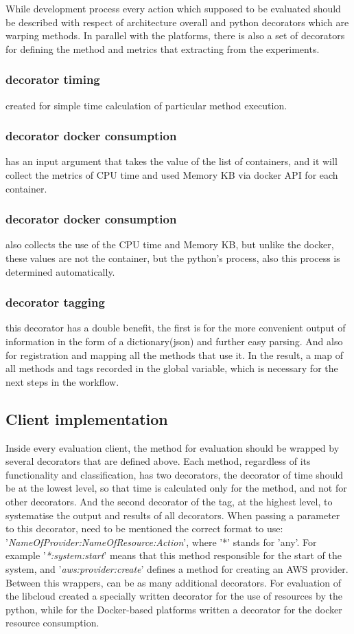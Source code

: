 While development process every action which supposed to be evaluated should be described with respect of architecture overall and python decorators which are warping methods. In parallel with the platforms, there is also a set of decorators for defining the method and metrics that extracting from the experiments.
\subsubsection{decorator timing} created for simple time calculation of particular method execution. 
\subsubsection{decorator docker consumption} has an input argument that takes the value of the list of containers, and it will collect the metrics of CPU time and used Memory KB via docker API for each container.
\subsubsection{decorator docker consumption} also collects the use of the CPU time and Memory KB, but unlike the docker, these values are not the container, but the python's process, also this process is determined automatically.
\subsubsection{decorator tagging} this decorator has a double benefit, the first is for the more convenient output of information in the form of a dictionary(json) and further easy parsing. And also for registration and mapping all the methods that use it. In the result, a map of all methods and tags recorded in the global variable, which is necessary for the next steps in the workflow. 
\subsection{Client implementation}
Inside every evaluation client, the method for evaluation should be wrapped by several decorators that are defined above. Each method, regardless of its functionality and classification, has two decorators, the decorator of time should be at the lowest level, so that time is calculated only for the method, and not for other decorators. And the second decorator of the tag, at the highest level, to systematise the output and results of all decorators. When passing a parameter to this decorator, need to be mentioned the correct format to use: '\textit{NameOfProvider:NameOfResource:Action}',  where '*' stands for 'any'. For example '\textit{*:system:start}' means that this method responsible for the start of the system, and '\textit{aws:provider:create}' defines a method for creating an AWS provider. Between this wrappers, can be as many additional decorators. For evaluation of the libcloud created a specially written decorator for the use of resources by the python, while for the Docker-based platforms written a decorator for the docker resource consumption.
